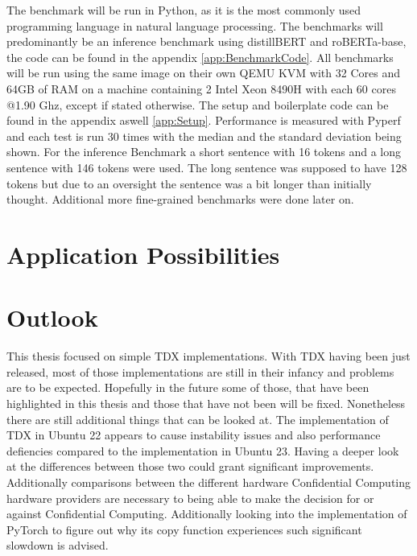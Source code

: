 The benchmark will be run in Python, as it is the most commonly used programming language in natural language processing. The benchmarks will predominantly be an inference benchmark using distillBERT and roBERTa-base, the code can be found in the appendix \ref{app:BenchmarkCode}. All benchmarks will be run using the same image on their own QEMU KVM with 32 Cores and 64GB of RAM on a machine containing 2 Intel Xeon 8490H with each 60 cores @1.90 Ghz, except if stated otherwise. The setup and boilerplate code can be found in the appendix aswell \ref{app:Setup}. Performance is measured with Pyperf and each test is run 30 times with the median and the standard deviation being shown.
For the inference Benchmark a short sentence with 16 tokens and a long sentence with 146 tokens were used. The long sentence was supposed to have 128 tokens but due to an oversight the sentence was a bit longer than initially thought. Additional more fine-grained benchmarks were done later on.



\section{Application Possibilities}




\section{Outlook}

This thesis focused on simple TDX implementations. With TDX having been just released, most of those implementations are still in their infancy and problems are to be expected. Hopefully in the future some of those, that have been highlighted in this thesis and those that have not been will be fixed. Nonetheless there are still additional things that can be looked at. The implementation of TDX in Ubuntu 22 appears to cause instability issues and also performance defiencies compared to the implementation in Ubuntu 23. Having a deeper look at the differences between those two could grant significant improvements. Additionally comparisons between the different hardware Confidential Computing hardware providers are necessary to being able to make the decision for or against Confidential Computing. Additionally looking into the implementation of PyTorch to figure out why its copy function experiences such significant slowdown is advised. 

